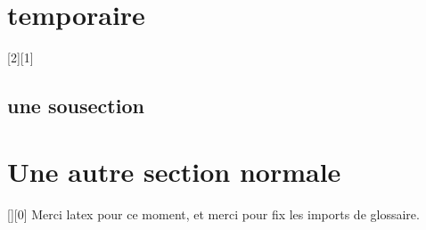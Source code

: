 \section{temporaire}
[2][1]
\subsection{une sousection}
\section{Une autre section normale}
[][0]
    Merci \gls{latex} pour ce moment, et merci \cite{latexmkrc} pour fix les imports de glossaire.



